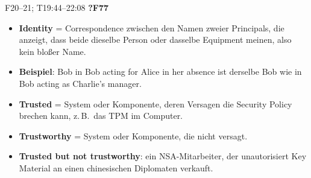 \documentclass[10pt,a4paper]{article}
\newcommand{\block}[2]{\par\vspace{3pt}{\bfseries #1}\hfill{\scriptsize #2}\par\nopagebreak}
\begin{document}
\block{Identity, Trust, Trustworthiness}{F20--21; T19:44--22:08 \quad \textbf{?F77}}
\begin{itemize}
\item \textbf{Identity} = Correspondence zwischen den Namen zweier Principals, die anzeigt, dass beide dieselbe Person oder dasselbe Equipment meinen, also kein bloßer Name.
\item \textbf{Beispiel}: Bob in \glqq Bob acting for Alice in her absence\grqq{} ist derselbe Bob wie in \glqq Bob acting as Charlie's manager\grqq.
\item \textbf{Trusted} = System oder Komponente, deren Versagen die Security Policy brechen kann, z.\,B.\ das TPM im Computer.
\item \textbf{Trustworthy} = System oder Komponente, die nicht versagt.
\item \textbf{Trusted but not trustworthy}: ein NSA-Mitarbeiter, der unautorisiert Key Material an einen chinesischen Diplomaten verkauft.
\end{itemize}
\end{document}
